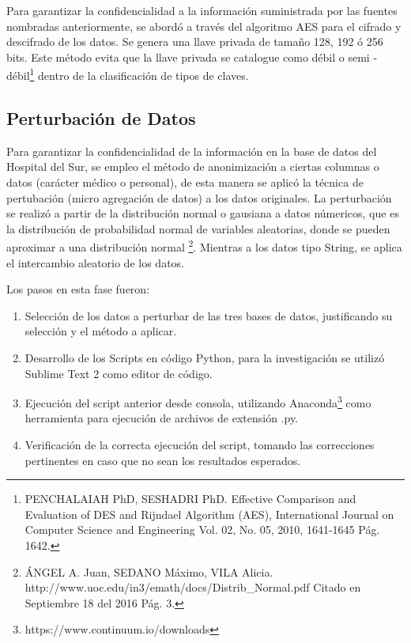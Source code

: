 \documentclass[a4paper,openright,12pt]{book}
\theoremstyle{definition}
\theoremstyle{remark}
\begin{document}
Para garantizar la confidencialidad a la información suministrada por las fuentes nombradas anteriormente, se abordó a través del algoritmo AES para el cifrado y descifrado de los datos. Se genera una llave privada de tamaño 128, 192 ó 256 bits. Este método evita que la llave privada se catalogue como débil o semi - débil\footnote{PENCHALAIAH PhD, SESHADRI  PhD. Effective Comparison and Evaluation of DES and Rijndael Algorithm (AES), International Journal on Computer Science and Engineering Vol. 02, No. 05, 2010, 1641-1645 Pág. 1642.} dentro de la clasificación de tipos de claves.
    
    \subsection{Perturbación de Datos}
     Para garantizar la confidencialidad de la información en la base de datos del Hospital del Sur, se empleo el método de anonimización a ciertas columnas o datos (carácter médico o personal), de esta manera se aplicó la técnica de pertubación (micro agregación de datos) a los datos originales. La perturbación se realizó a partir de la distribución normal o gausiana a datos númericos, que es la distribución de probabilidad normal de variables aleatorias, donde se pueden aproximar a una distribución normal \footnote{ÁNGEL A. Juan, SEDANO Máximo, VILA Alicia. http://www.uoc.edu/in3/emath/docs/Distrib\_Normal.pdf Citado en Septiembre 18 del 2016 Pág. 3. }. 
Mientras a los datos tipo String, se aplica el intercambio aleatorio de los datos.

Los pasos en esta fase fueron:
\begin{enumerate}
	\item Selección de los datos a perturbar de las tres bases de datos, justificando su selección y el método a aplicar.
    \item Desarrollo de los Scripts en código Python, para la investigación se utilizó Sublime Text 2 como editor de código.
    \item Ejecución del script anterior desde consola, utilizando Anaconda\footnote{https://www.continuum.io/downloads} como herramienta para ejecución de archivos de extensión .py.
    \item Verificación de la correcta ejecución del script, tomando las correcciones pertinentes en caso que no sean los resultados esperados.
\end{enumerate}
\end{document}
